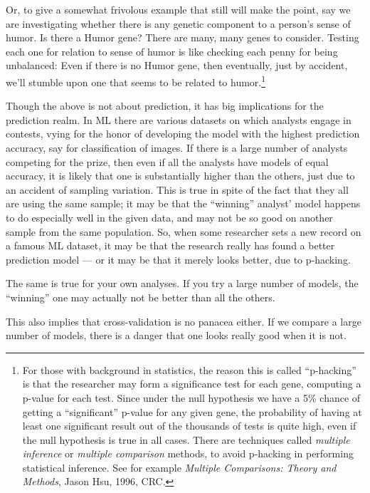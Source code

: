 Or, to give a somewhat frivolous example that still will make the point,
say we are investigating whether there is any genetic component to a
person's sense of humor.  Is there a Humor gene?  There are many, many
genes to consider.  Testing each one for relation to sense of humor is
like checking each penny for being unbalanced: Even if there is no Humor
gene, then eventually, just by accident, we'll stumble upon one that
seems to be related to humor.\footnote{For those with background in
statistics, the reason this is called ``p-hacking'' is that the
researcher may form a significance test for each gene, computing a
p-value for each test.  Since under the null hypothesis we have a 5\%
chance of getting a ``significant'' p-value for any given gene, the
probability of having at least one significant result out of the
thousands of tests is quite high, even if the null hypothesis is true in
all cases.  There are techniques called \textit{multiple inference} or
\textit{multiple comparison} methods, to avoid p-hacking in performing
statistical inference.  See for example \textit{Multiple Comparisons:
Theory and Methods}, Jason Hsu, 1996, CRC.}

Though the above is not about prediction, it has big implications for
the prediction realm.  In ML there are various datasets on which
analysts engage in contests, vying for the honor of developing the model
with the highest prediction accuracy, say for classification of images.
If there is a large number of analysts competing for the prize, then
even if all the analysts have models of equal accuracy, it is likely
that one is substantially higher than the others, just due to an
accident of sampling variation.  This is true in spite of the fact that
they all are using the same sample; it may be that the ``winning''
analyst' model happens to do especially well in the given data, and may
not be so good on another sample from the same population.  So, when some
researcher sets a new record on a famous ML dataset, it may be that the
research really has found a better prediction model --- or it may be
that it merely looks better, due to p-hacking.

The same is true for your own analyses.  If you try a large number of
models, the ``winning'' one may actually not be better than all the
others.

This also implies that cross-validation is no panacea either.  If we
compare a large number of models, there is a danger that one looks
really good when it is not.


